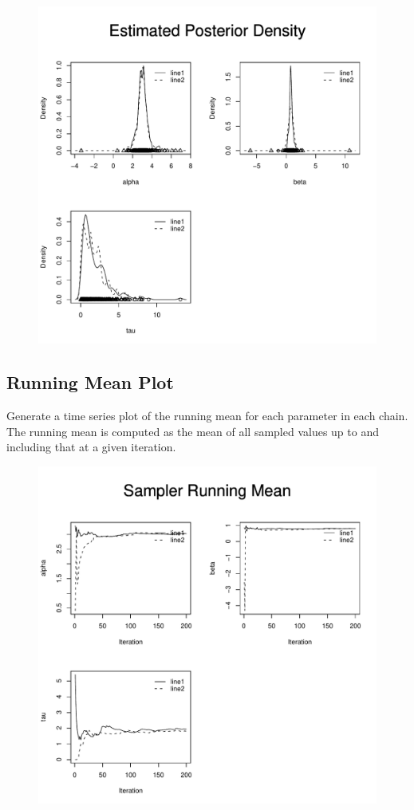\documentclass[12pt,letterpaper]{report}
\begin{document}
\begin{figure}[h]
\centering
\includegraphics[keepaspectratio,width=5in]{density.pdf}
\end{figure}

\pagebreak

\subsection{Running Mean Plot}
\noindent
Generate a time series plot of the running mean for each parameter in each
chain. The running mean is computed as the mean of all sampled values up to and
including that at a given iteration.

\begin{figure}[h]
\centering
\includegraphics[keepaspectratio,width=5in]{mean.pdf}
\end{figure}
\end{document}
